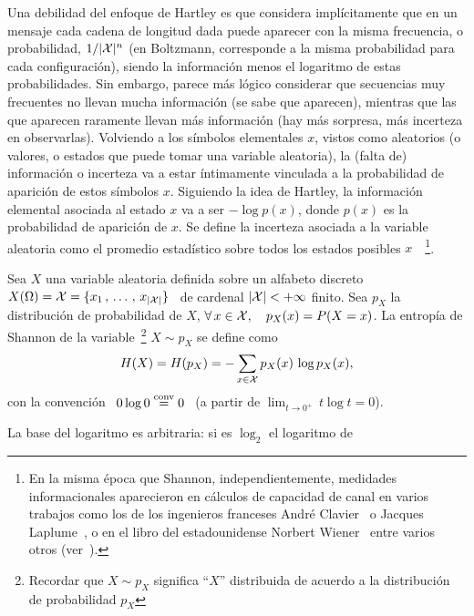 Una debilidad del enfoque de Hartley es que considera impl\'icitamente que en un
mensaje cada cadena  de longitud dada puede aparecer con  la misma frecuencia, o
probabilidad, $1/|\mathcal{X}|^n$ (en Boltzmann, corresponde a la misma probabilidad para
cada  configuraci\'on), siendo  la  informaci\'on menos  el  logaritmo de  estas
probabilidades.  Sin  embargo, parece  m\'as l\'ogico considerar  que secuencias
muy frecuentes  no llevan mucha  informaci\'on (se sabe que  aparecen), mientras
que las que  aparecen raramente llevan m\'as informaci\'on  (hay m\'as sorpresa,
m\'as incerteza  en observarlas).  Volviendo  a los s\'imbolos  elementales $x$,
vistos  como aleatorios  (o  valores, o  estados que  puede  tomar una  variable
aleatoria), la  (falta de)  informaci\'on o incerteza  va a  estar \'intimamente
vinculada a la probabilidad de aparici\'on de estos s\'imbolos $x$. Siguiendo la
idea de Hartley, la informaci\'on elemental asociada al estado $x$ va a ser $-
\log p(x)$, donde $p(x)$ es la  probabilidad de aparici\'on de $x$.  Se define la
incerteza asociada a la variable  aleatoria como el promedio estad\'istico sobre
todos   los   estados   posibles  $x$~\cite{Sha48,   ShaWea64}~\footnote{En   la
misma  \'epoca   que  Shannon,  independientemente,   medidades  informacionales
aparecieron en c\'alculos  de capacidad de canal en varios  trabajos como los de
los    ingenieros    franceses    Andr\'e   Clavier~\cite{Cla48}    o    Jacques
Laplume~\cite{Lap48},    o   en    el   libro    del   estadounidense    Norbert
Wiener~\cite[Cap.~III]{Wie48}  entre  varios   otros  (ver~\cite[y  Ref.]{Ver98,
Lun02, RioMag14, FlaRio16, RioFla17, Che17}).}.
%
\begin{definicion}
\label{Def:SZ:Shannon}
%
  Sea  $X$  una  variable  aleatoria  definida  sobre  un  alfabeto  discreto  \
  $X(\Omega) = \mathcal{X}  = \{ x_1 \,  , \, \ldots \,  , \, x_{|\mathcal{X}|} \}$  \ de cardenal
  $|\mathcal{X}|  < +  \infty$ finito.  Sea $p_X$  la distribuci\'on  de probabilidad  de
  $X$, \ie $  \forall \, x \in \mathcal{X},  \quad p_X(x) = P(X = x)$.   La entrop\'ia de
  Shannon de la  variable~\footnote{Recordar que $X \sim  p_X$ significa ``$X$''
  distribuida de acuerdo a la distribuci\'on de probabilidad $p_X$} $X \sim p_X$
  se define como
  \[
    H(X) = H(p_X) = - \sum_{x \in \mathcal{X}} p_X(x) \, \log p_X(x),
  \]
  con   la   convenci\'on   \   $0   \log    0   \stackrel{\mathrm{conv}}{=}   0$   \   (a   partir   de
  $\displaystyle \lim_{t \to 0^+} \, t \log t = 0$).
\end{definicion}
%
\noindent La  base del logaritmo es  arbitraria: si es $\log_2$  el logaritmo de
